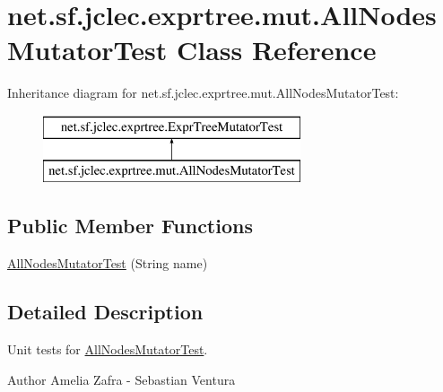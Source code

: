 \hypertarget{classnet_1_1sf_1_1jclec_1_1exprtree_1_1mut_1_1_all_nodes_mutator_test}{\section{net.\-sf.\-jclec.\-exprtree.\-mut.\-All\-Nodes\-Mutator\-Test Class Reference}
\label{classnet_1_1sf_1_1jclec_1_1exprtree_1_1mut_1_1_all_nodes_mutator_test}
}
Inheritance diagram for net.\-sf.\-jclec.\-exprtree.\-mut.\-All\-Nodes\-Mutator\-Test\-:\begin{figure}[H]
\begin{center}
\leavevmode
\includegraphics[height=2.000000cm]{classnet_1_1sf_1_1jclec_1_1exprtree_1_1mut_1_1_all_nodes_mutator_test}
\end{center}
\end{figure}
\subsection*{Public Member Functions}
\begin{DoxyCompactItemize}
\item 
\hyperlink{classnet_1_1sf_1_1jclec_1_1exprtree_1_1mut_1_1_all_nodes_mutator_test_ae668b8b26ae1a93a5d0a61073d5d0b84}{All\-Nodes\-Mutator\-Test} (String name)
\end{DoxyCompactItemize}


\subsection{Detailed Description}
Unit tests for \hyperlink{classnet_1_1sf_1_1jclec_1_1exprtree_1_1mut_1_1_all_nodes_mutator_test}{All\-Nodes\-Mutator\-Test}.

\begin{DoxyAuthor}{Author}
Amelia Zafra -\/ Sebastian Ventura 
\end{DoxyAuthor}


